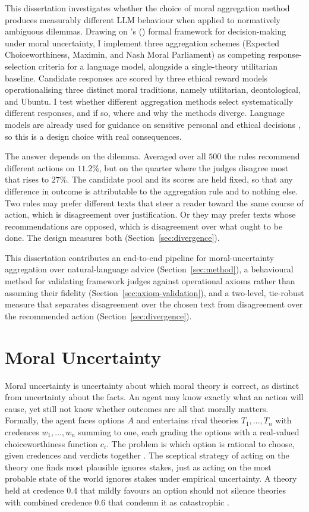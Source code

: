 \documentclass[10pt,twocolumn,a4paper]{article}
\let\cite\citep
\begin{document}
This dissertation investigates whether the choice of moral
aggregation method produces measurably different LLM behaviour when applied
to normatively ambiguous dilemmas. Drawing on \citeauthor{macaskill2020}'s
(\citeyear{macaskill2020}) formal framework for decision-making under
moral uncertainty, I implement three aggregation schemes (Expected
Choiceworthiness, Maximin, and Nash Moral Parliament) as competing
response-selection criteria for a language model, alongside a single-theory
utilitarian baseline. Candidate responses are scored by three ethical
reward models operationalising three distinct moral traditions, namely
utilitarian, deontological, and Ubuntu. I test whether different
aggregation methods select systematically different responses, and if so,
where and why the methods diverge. Language models are already used for
guidance on sensitive personal and ethical decisions
\cite{dailydilemmas2024}, so this is a design choice with real
consequences.

The answer depends on the dilemma. Averaged over all $500$ the rules
recommend different actions on $11.2\%$, but on the quarter where the
judges disagree most that rises to $27\%$. The candidate pool and its scores are held
fixed, so that any difference in outcome is attributable to the
aggregation rule and to nothing else. Two rules
may prefer different texts that steer a reader toward the same course of
action, which is disagreement over justification. Or they may prefer
texts whose recommendations are opposed, which is disagreement over what
ought to be done. The design measures both
(Section~\ref{sec:divergence}).

This dissertation contributes an end-to-end pipeline for
moral-uncertainty aggregation over natural-language advice
(Section~\ref{sec:method}), a behavioural method for validating
framework judges against operational axioms rather than assuming their
fidelity (Section~\ref{sec:axiom-validation}), and a two-level,
tie-robust measure that separates disagreement over the chosen text
from disagreement over the recommended action
(Section~\ref{sec:divergence}).


\section{Moral Uncertainty}
\label{sec:background}

Moral uncertainty is uncertainty about which moral theory is correct, as
distinct from uncertainty about the facts. An agent may know exactly what an
action will cause, yet still not know whether outcomes are all that morally
matters. Formally, the agent faces options $A$ and entertains rival theories
$T_1, \dots, T_n$ with credences $w_1, \dots, w_n$ summing to one, each
grading the options with a real-valued choiceworthiness function $c_i$. The
problem is which option is rational to choose, given credences and
verdicts together \cite{macaskill2020}. The sceptical strategy of acting on
the theory one finds most plausible ignores stakes, just as acting on the
most probable state of the world ignores stakes under empirical
uncertainty. A theory held at credence $0.4$ that mildly favours an
option should not silence theories with combined credence $0.6$ that
condemn it as catastrophic \cite{macaskill2020}.
\end{document}
